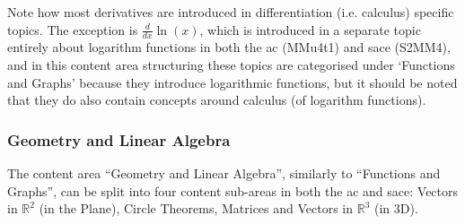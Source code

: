 \documentclass[twoside,12pt,a4paper]{report}
\begin{document}
Note how most derivatives are introduced in differentiation (i.e. calculus) specific topics. The exception is $\frac{d}{dx}\ln(x)$, which is introduced in a separate topic entirely about logarithm functions in both the \gls{ac} (MMu4t1) and \gls{sace} (S2MM4), and in this content area structuring these topics are categorised under `Functions and Graphs' because they introduce logarithmic functions, but it should be noted that they do also contain concepts around calculus (of logarithm functions).

\subsubsection{Geometry and Linear Algebra}

The content area ``Geometry and Linear Algebra'', similarly to ``Functions and Graphs'', can be split into four content sub-areas in both the \gls{ac} and \gls{sace}: Vectors in $\mathbb{R}^2$ (in the Plane), Circle Theorems, Matrices and Vectors in $\mathbb{R}^3$ (in 3D).
\end{document}
